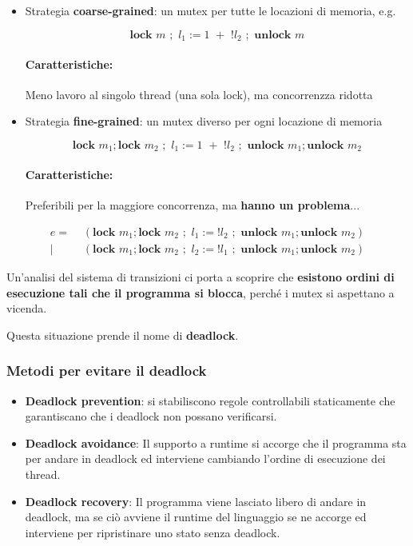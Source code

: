 \documentclass[a4paper,10pt]{article}
\begin{document}
\begin{itemize}
 \item Strategia \textbf{coarse-grained}: un mutex per tutte le locazioni di memoria, e.g.
 
 \[ \textbf{lock }m\,\,;\,\, l_1 := 1 \,\,+\,\, !l_2 \,\,;\,\, \textbf{unlock }m \]
 
 \paragraph{Caratteristiche:} Meno lavoro al singolo thread (una sola lock), ma concorrenzza ridotta
 
 \item Strategia \textbf{fine-grained}: un mutex diverso per ogni locazione di memoria
 
  
 \[ \textbf{lock }m_1;\textbf{lock }m_2\,\,;\,\, l_1 := 1 \,\,+\,\, !l_2 \,\,;\,\, \textbf{unlock }m_1; \textbf{unlock }m_2 \]
 \paragraph{Caratteristiche:} Preferibili per la maggiore concorrenza, ma \textbf{hanno un problema}...
\end{itemize}

\[\begin{aligned}
e =&\,\,  (\textbf{lock }m_1;\textbf{lock }m_2\,\,;\,\, l_1 := !l_2 \,\,;\,\, \textbf{unlock }m_1; \textbf{unlock }m_2) \\
 |&\,\, (\textbf{lock }m_1;\textbf{lock }m_2\,\,;\,\, l_2 := !l_1 \,\,;\,\, \textbf{unlock }m_1; \textbf{unlock }m_2) 
\end{aligned}\]\smallskip


Un'analisi del sistema di transizioni ci porta a scoprire che \textbf{esistono ordini di esecuzione tali che il programma si blocca}, perché i mutex si aspettano a vicenda. \smallskip

Questa situazione prende il nome di \textbf{deadlock}.

\subsubsection{Metodi per evitare il deadlock}


\begin{itemize}
 \item \textbf{Deadlock prevention}: si stabiliscono regole controllabili staticamente che garantiscano che i deadlock non possano verificarsi.
 \item \textbf{Deadlock avoidance}: Il supporto a runtime si accorge che il programma sta per andare in deadlock ed interviene cambiando l'ordine di esecuzione dei thread.
 
 \item \textbf{Deadlock recovery}: Il programma viene lasciato libero di andare in deadlock, ma se ciò avviene il runtime del linguaggio se ne accorge ed interviene per ripristinare uno stato senza deadlock.
\end{itemize}
\end{document}
